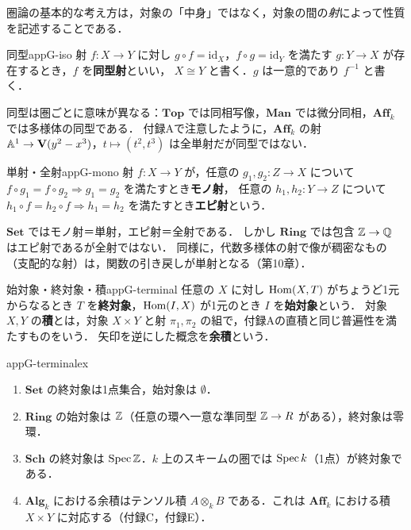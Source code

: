 圏論の基本的な考え方は，対象の「中身」ではなく，対象の間の\emph{射}によって性質を記述することである．

\begin{mydef}{同型}{appG-iso}
射 $f\colon X\to Y$ に対し $g\circ f=\mathrm{id}_X$，$f\circ g=\mathrm{id}_Y$ を満たす $g\colon Y\to X$ が存在するとき，$f$ を\textbf{同型射}といい，
$X\cong Y$ と書く．$g$ は一意的であり $f^{-1}$ と書く．
\end{mydef}

同型は圏ごとに意味が異なる：$\mathbf{Top}$ では同相写像，$\mathbf{Man}$ では微分同相，$\mathbf{Aff}_k$ では多様体の同型である．
付録Aで注意したように，$\mathbf{Aff}_k$ の射 $\mathbb{A}^1\to\mathbf{V}(y^2-x^3)$，$t\mapsto(t^2,t^3)$ は全単射だが同型ではない．

\begin{mydef}{単射・全射}{appG-mono}
射 $f\colon X\to Y$ が，任意の $g_1,g_2\colon Z\to X$ について $f\circ g_1=f\circ g_2\Rightarrow g_1=g_2$ を満たすとき\textbf{モノ射}，
任意の $h_1,h_2\colon Y\to Z$ について $h_1\circ f=h_2\circ f\Rightarrow h_1=h_2$ を満たすとき\textbf{エピ射}という．
\end{mydef}

$\mathbf{Set}$ ではモノ射＝単射，エピ射＝全射である．
しかし $\mathbf{Ring}$ では包含 $\mathbb{Z}\to\mathbb{Q}$ はエピ射であるが全射ではない．
同様に，代数多様体の射で像が稠密なもの（支配的な射）は，関数の引き戻しが単射となる（第10章）．

\begin{mydef}{始対象・終対象・積}{appG-terminal}
任意の $X$ に対し $\operatorname{Hom}(X,T)$ がちょうど1元からなるとき $T$ を\textbf{終対象}，$\operatorname{Hom}(I,X)$ が1元のとき $I$ を\textbf{始対象}という．
対象 $X,Y$ の\textbf{積}とは，対象 $X\times Y$ と射 $\pi_1,\pi_2$ の組で，付録Aの直積と同じ普遍性を満たすものをいう．
矢印を逆にした概念を\textbf{余積}という．
\end{mydef}

\begin{myex}{}{appG-terminalex}
\begin{enumerate}
\item $\mathbf{Set}$ の終対象は1点集合，始対象は $\emptyset$．
\item $\mathbf{Ring}$ の始対象は $\mathbb{Z}$（任意の環へ一意な準同型 $\mathbb{Z}\to R$ がある），終対象は零環．
\item $\mathbf{Sch}$ の終対象は $\operatorname{Spec}\mathbb{Z}$．$k$ 上のスキームの圏では $\operatorname{Spec} k$（1点）が終対象である．
\item $\mathbf{Alg}_k$ における余積はテンソル積 $A\otimes_kB$ である．これは $\mathbf{Aff}_k$ における積 $X\times Y$ に対応する（付録C，付録E）．
\end{enumerate}
\end{myex}

